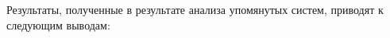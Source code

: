 Результаты, полученные в результате анализа упомянутых систем, приводят к следующим выводам:
%
%
%     
%
%
